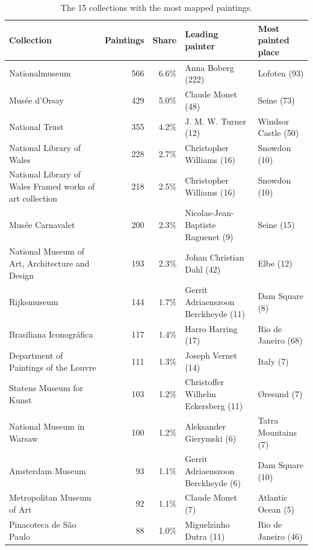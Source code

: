 \documentclass[11pt,a4paper]{article}
\begin{document}
\begin{table}[tbp]\centering\footnotesize\setlength{\tabcolsep}{4pt}\caption{The 15 collections with the most mapped paintings.}\label{tab:colls}\begin{tabular}{p{4.6cm}rrp{4.2cm}l}\toprule Collection & Paintings & Share & Leading painter & Most painted place\\\midrule
Nationalmuseum & 566 & 6.6\% & Anna Boberg (222) & Lofoten (93)\\
Musée d'Orsay & 429 & 5.0\% & Claude Monet (48) & Seine (73)\\
National Trust & 355 & 4.2\% & J. M. W. Turner (12) & Windsor Castle (50)\\
National Library of Wales & 228 & 2.7\% & Christopher Williams (16) & Snowdon (10)\\
National Library of Wales Framed works of art collection & 218 & 2.5\% & Christopher Williams (16) & Snowdon (10)\\
Musée Carnavalet & 200 & 2.3\% & Nicolas-Jean-Baptiste Raguenet (9) & Seine (15)\\
National Museum of Art, Architecture and Design & 193 & 2.3\% & Johan Christian Dahl (42) & Elbe (12)\\
Rijksmuseum & 144 & 1.7\% & Gerrit Adriaenszoon Berckheyde (11) & Dam Square (8)\\
Brasiliana Iconográfica & 117 & 1.4\% & Harro Harring (17) & Rio de Janeiro (68)\\
Department of Paintings of the Louvre & 111 & 1.3\% & Joseph Vernet (14) & Italy (7)\\
Statens Museum for Kunst & 103 & 1.2\% & Christoffer Wilhelm Eckersberg (11) & Øresund (7)\\
National Museum in Warsaw & 100 & 1.2\% & Aleksander Gierymski (6) & Tatra Mountains (7)\\
Amsterdam Museum & 93 & 1.1\% & Gerrit Adriaenszoon Berckheyde (6) & Dam Square (10)\\
Metropolitan Museum of Art & 92 & 1.1\% & Claude Monet (7) & Atlantic Ocean (5)\\
Pinacoteca de São Paulo & 88 & 1.0\% & Miguelzinho Dutra (11) & Rio de Janeiro (46)\\
\bottomrule\end{tabular}\end{table}
\end{document}
